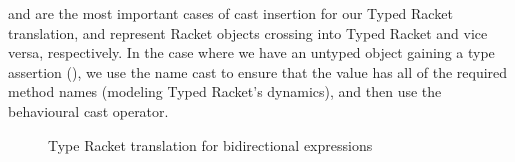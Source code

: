 \documentclass[a4paper,USenglish]{tex/lipics-v2016}
\begin{document}
% 
% 
% 
% 
% 
% 
% 
% 

 and  are the most important cases of cast 
insertion for our Typed Racket translation, and represent Racket objects 
crossing into Typed Racket and vice versa, respectively. In the case where we 
have an untyped object gaining a type assertion (), we use the
name cast to ensure that the value has all of the required method names 
(modeling Typed Racket's dynamics), and then use the behavioural cast operator.


\begin{figure}[h!]
\begin{mathpar}

\end{mathpar}
\caption{Type Racket translation for bidirectional expressions}
\label{fig:behtrans_exp2}
\end{figure}
\end{document}
